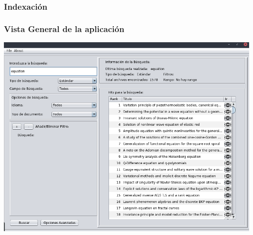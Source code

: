 \documentclass{beamer} %
\begin{document}
\begin{frame}
\frametitle{Indexación}

\end{frame}

\begin{frame}
\frametitle{Vista General de la aplicación}
	\begin{center}
		\includegraphics[scale=0.25]{Img/Img1.png} 
	\end{center}
\end{frame}
\end{document}

